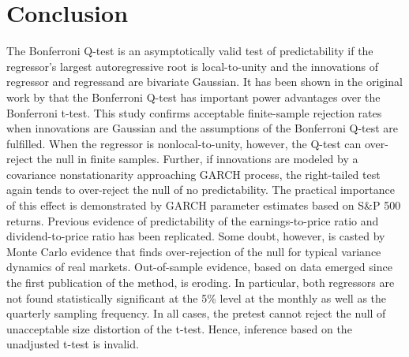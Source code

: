 \documentclass[11pt, a4paper]{article}
\begin{document}
\section{Conclusion}
\label{conclusion}

The Bonferroni Q-test is an asymptotically valid test of predictability if the regressor's largest autoregressive root is local-to-unity and the innovations of regressor and regressand are bivariate Gaussian. It has been shown in the original work by \citet{campbell2006efficient} that the Bonferroni Q-test has important power advantages over the Bonferroni t-test. This study confirms acceptable finite-sample rejection rates when innovations are Gaussian and the assumptions of the Bonferroni Q-test are fulfilled. When the regressor is nonlocal-to-unity, however, the Q-test can over-reject the null in finite samples. Further, if innovations are modeled by a covariance nonstationarity approaching GARCH process, the right-tailed test again tends to over-reject the null of no predictability. The practical importance of this effect is demonstrated by GARCH parameter estimates based on S\&P 500 returns. Previous evidence of predictability of the earnings-to-price ratio and dividend-to-price ratio has been replicated. Some doubt, however, is casted by Monte Carlo evidence that finds over-rejection of the null for typical variance dynamics of real markets. Out-of-sample evidence, based on data emerged since the first publication of the method, is eroding. In particular, both regressors are not found statistically significant at the 5\% level at the monthly as well as the quarterly sampling frequency. In all cases, the pretest cannot reject the null of unacceptable size distortion of the t-test. Hence, inference based on the unadjusted t-test is invalid.

\pagebreak


\end{document}
